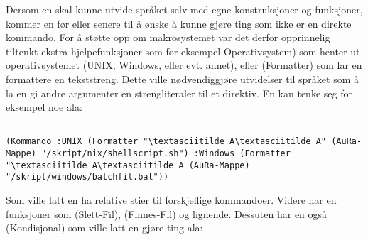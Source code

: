 \documentclass[11pt]{article}
\begin{document}
Dersom en skal kunne utvide språket selv med egne konstruksjoner og funksjoner, kommer en før eller senere til å ønske å kunne gjøre ting som ikke er en direkte kommando.
For å støtte opp om makrosystemet var det derfor opprinnelig tiltenkt ekstra hjelpefunksjoner som for eksempel  Operativsystem) som henter ut operativsystemet (UNIX, Windows, eller evt. annet), eller (Formatter) som lar en formattere en tekststreng.
Dette ville nødvendiggjøre utvidelser til språket som å la en gi andre argumenter en strengliteraler til et direktiv.
En kan tenke seg for eksempel noe ala:




\begin{lstlisting}

(Kommando :UNIX (Formatter "\textasciitilde A\textasciitilde A" (AuRa-Mappe) "/skript/nix/shellscript.sh") :Windows (Formatter "\textasciitilde A\textasciitilde A (AuRa-Mappe) "/skript/windows/batchfil.bat"))
\end{lstlisting}




Som ville latt en ha relative stier til forskjellige kommandoer. Videre har en funksjoner som (Slett-Fil), (Finnes-Fil) og lignende. Dessuten har en også (Kondisjonal) som ville latt en gjøre ting ala:
\end{document}
